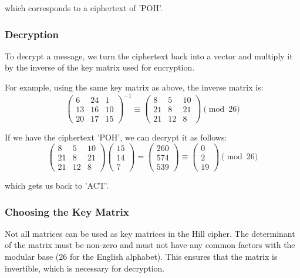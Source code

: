 \documentclass[12pt,a4paper]{article}
\begin{document}
which corresponds to a ciphertext of 'POH'.

\subsubsection*{Decryption}

To decrypt a message, we turn the ciphertext back into a vector and multiply it by the inverse of the key matrix used for encryption.

For example, using the same key matrix as above, the inverse matrix is:
\[
\begin{pmatrix}
6 & 24 & 1 \\
13 & 16 & 10 \\
20 & 17 & 15
\end{pmatrix}^{-1}
\equiv 
\begin{pmatrix}
8 & 5 & 10 \\
21 & 8 & 21 \\
21 & 12 & 8
\end{pmatrix} \pmod {26}
\]

If we have the ciphertext 'POH', we can decrypt it as follows:
\[
\begin{pmatrix}
8 & 5 & 10 \\
21 & 8 & 21 \\
21 & 12 & 8
\end{pmatrix}
\begin{pmatrix}
15 \\
14 \\
7
\end{pmatrix}
=
\begin{pmatrix}
260 \\
574 \\
539
\end{pmatrix}
\equiv 
\begin{pmatrix}
0 \\
2 \\
19
\end{pmatrix} \pmod {26}
\]

which gets us back to 'ACT'.

\subsubsection*{Choosing the Key Matrix}

Not all matrices can be used as key matrices in the Hill cipher. The determinant of the matrix must be non-zero and must not have any common factors with the modular base (26 for the English alphabet). This ensures that the matrix is invertible, which is necessary for decryption.
\end{document}
